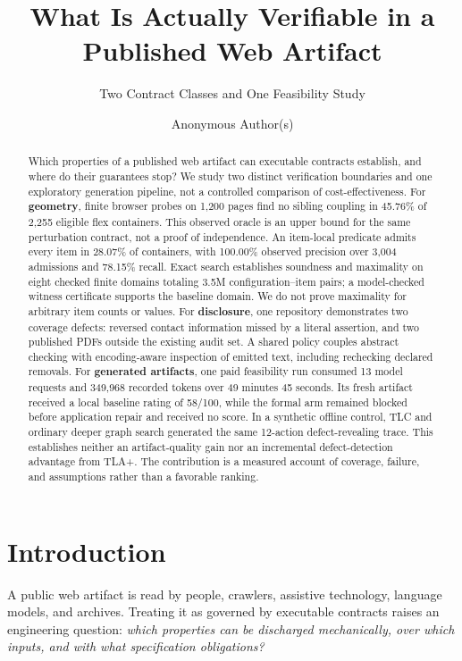 \documentclass[acmsmall,screen,review,anonymous,nonacm]{acmart}
\title{What Is Actually Verifiable in a Published Web Artifact}
\subtitle{Two Contract Classes and One Feasibility Study}
\author{Anonymous Author(s)}
\begin{document}
\begin{abstract}
Which properties of a published web artifact can executable contracts establish, and where do their guarantees stop? We study two distinct verification boundaries and one exploratory generation pipeline, not a controlled comparison of cost-effectiveness. For \textbf{geometry}, finite browser probes on 1{,}200 pages find no sibling coupling in 45.76\% of 2{,}255 eligible flex containers. This observed oracle is an upper bound for the same perturbation contract, not a proof of independence. An item-local predicate admits every item in 28.07\% of containers, with 100.00\% observed precision over 3{,}004 admissions and 78.15\% recall. Exact search establishes soundness and maximality on eight checked finite domains totaling 3.5M configuration--item pairs; a model-checked witness certificate supports the baseline domain. We do not prove maximality for arbitrary item counts or values. For \textbf{disclosure}, one repository demonstrates two coverage defects: reversed contact information missed by a literal assertion, and two published PDFs outside the existing audit set. A shared policy couples abstract checking with encoding-aware inspection of emitted text, including rechecking declared removals. For \textbf{generated artifacts}, one paid feasibility run consumed 13 model requests and 349{,}968 recorded tokens over 49 minutes 45 seconds. Its fresh artifact received a local baseline rating of 58/100, while the formal arm remained blocked before application repair and received no score. In a synthetic offline control, TLC and ordinary deeper graph search generated the same 12-action defect-revealing trace. This establishes neither an artifact-quality gain nor an incremental defect-detection advantage from TLA+. The contribution is a measured account of coverage, failure, and assumptions rather than a favorable ranking.
\end{abstract}


\maketitle

\section{Introduction}
A public web artifact is read by people, crawlers, assistive technology, language models, and archives. Treating it as governed by executable contracts raises an engineering question: \emph{which properties can be discharged mechanically, over which inputs, and with what specification obligations?}
\end{document}
